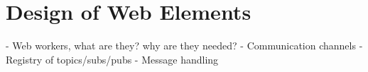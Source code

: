 \chapter{Design of Web Elements}\label{cha:web}


- Web workers, what are they? why are they needed?
- Communication channels
- Registry of topics/subs/pubs
- Message handling